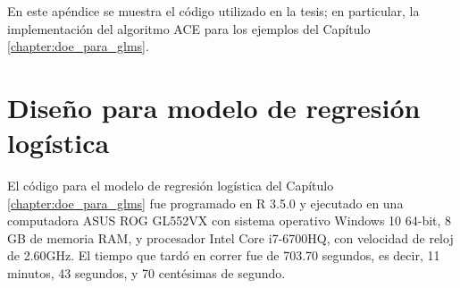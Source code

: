 En este apéndice se muestra el código utilizado en la tesis; en particular, la implementación del algoritmo ACE para los ejemplos del Capítulo \ref{chapter:doe_para_glms}.


\section{Diseño para modelo de regresión logística}


El código para el modelo de regresión logística del Capítulo \ref{chapter:doe_para_glms} fue programado en \textsf{R} 3.5.0 \citep{R} y ejecutado en una computadora ASUS ROG GL552VX con sistema operativo Windows 10 64-bit, 8 GB de memoria RAM, y procesador Intel Core i7-6700HQ, con velocidad de reloj de 2.60GHz. El tiempo que tardó en correr fue de 703.70 segundos, es decir, 11 minutos, 43 segundos, y 70 centésimas de segundo.

\vskip 1cm

